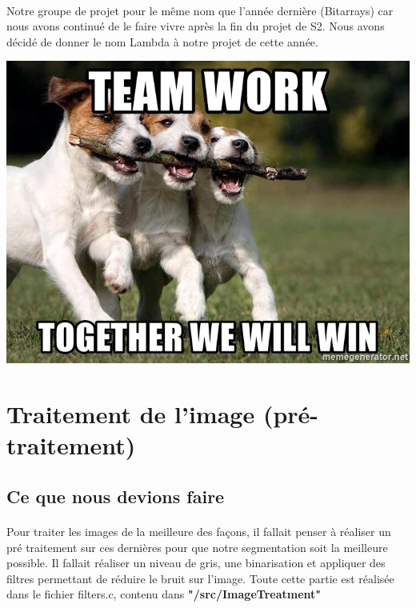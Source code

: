 \documentclass{article}
\begin{document}
\paragraph{}Notre groupe de projet pour le même nom que l'année dernière (Bitarrays) car nous avons continué de le faire vivre après la fin du projet de S2. Nous avons décidé de donner le nom Lambda à notre projet de cette année.

\vspace*{0.5cm}
\begin{center}
	\includegraphics[scale=0.4]{work}
\end{center}


\newpage

\section{Traitement de l'image (pré-traitement)}

\subsection{Ce que nous devions faire}

\paragraph{}Pour traiter les images de la meilleure des façons, il fallait penser à réaliser un pré traitement sur ces dernières pour que notre segmentation soit la meilleure possible. Il fallait réaliser un niveau de gris, une binarisation et appliquer des filtres permettant de réduire le bruit sur l'image. Toute cette partie est réalisée dans le fichier filters.c, contenu dans \textbf{"/src/ImageTreatment"}
\end{document}

